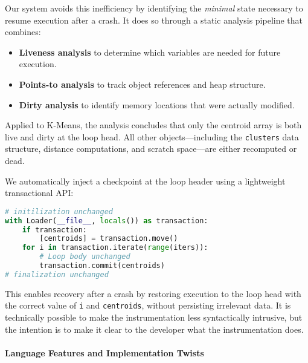 Our system avoids this inefficiency by identifying the \emph{minimal} state necessary to resume execution after a crash. It does so through a static analysis pipeline that combines:
\begin{itemize}
    \item \textbf{Liveness analysis} to determine which variables are needed for future execution.
    \item \textbf{Points-to analysis} to track object references and heap structure.
    \item \textbf{Dirty analysis} to identify memory locations that were actually modified.
\end{itemize}
Applied to K-Means, the analysis concludes that only the centroid array is both live and dirty at the loop head. All other objects---including the \texttt{clusters} data structure, distance computations, and scratch space---are either recomputed or dead.

We automatically inject a checkpoint at the loop header using a lightweight transactional API:
\begin{lstlisting}[language=python]
# initilization unchanged
with Loader(__file__, locals()) as transaction:
    if transaction:
        [centroids] = transaction.move()
    for i in transaction.iterate(range(iters)):
        # Loop body unchanged
        transaction.commit(centroids)
# finalization unchanged
\end{lstlisting}
This enables recovery after a crash by restoring execution to the loop head with the correct value of \texttt{i} and \texttt{centroids}, without persisting irrelevant data. It is technically possible to make the instrumentation less syntactically intrusive, but the intention is to make it clear to the developer what the instrumentation does.

\paragraph{Language Features and Implementation Twists}

